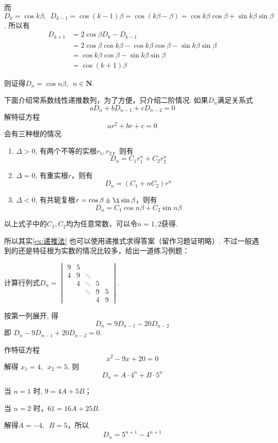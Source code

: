 \begin{solution}
    而$D_{k}=\cos k \beta,\enspace
        D_{k-1}=\cos (k-1)\beta = \cos (k \beta-\beta) = \cos k \beta \cos \beta+\sin k \beta \sin \beta$. 所以有
    \begin{align*}
        D_{k+1} & = 2 \cos \beta D_{k}-D_{k-1}                                               \\
                & =2 \cos \beta \cos k \beta-\cos k \beta \cos \beta-\sin k \beta \sin \beta \\
                & =\cos k \beta \cos \beta-\sin k \beta \sin \beta                           \\
                & =\cos (k+1) \beta
    \end{align*}

    则证得$D_n=\cos n\beta,\enspace n\in \mathbf{N}$.
\end{solution}

下面介绍常系数线性递推数列，为了方便，只介绍二阶情况. 如果$D_n$满足关系式
\[ aD_n+bD_{n-1}+cD_{n-2}=0 \]
解特征方程
\[ ar^2+br+c=0 \]
会有三种根的情况.
\begin{enumerate}
    \item $\Delta>0$, 有两个不等的实根$r_1, r_2$，则有
          \[ D_n=C_1r_1^n+C_2r_2^n \]

    \item $\Delta=0$, 有重实根$r$，则有
          \[ D_n=(C_1+nC_2)r^n \]

    \item $\Delta<0$, 有共轭复根$r=\cos\beta\pm \i\sin\beta$，则有
          \[ D_n=C_1\cos n\beta + C_2\sin n\beta \]
\end{enumerate}
以上式子中的$C_1,C_2$均为任意常数，可以令$n=1,2$获得.

所以其实\autoref{ex:递推法} 也可以使用递推式求得答案（留作习题证明略）. 不过一般遇到的还是特征根为实数的情况比较多，给出一道练习例题：

\begin{example}{}{}
    计算行列式$D_n=
        \begin{vmatrix}
            9 & 5 &        &   &   \\
            4 & 9 & \ddots &   &   \\
              & 4 & \ddots & 5 &   \\
              &   & \ddots & 9 & 5 \\
              &   &        & 4 & 9
        \end{vmatrix}$.
\end{example}

\begin{solution}
    按第一列展开, 得
    \[ D_n=9 D_{n-1}-20 D_{n-2} \]
    即 $ D_n-9 D_{n-1}+20 D_{n-2}=0 $.

    作特征方程
    \[ x^{2}-9 x+20=0 \]
    解得 $ x_1=4,\enspace x_2=5 $. 则
    \[ D_n=A \cdot 4^n+B \cdot 5^n \]

    当 $n=1$ 时, $9=4A+5B$；

    当 $n=2$ 时，$61=16A+25B$.

    解得$A=-4,\enspace B=5$，所以
    \[ D_n=5^{n+1}-4^{n+1} \]
\end{solution}

